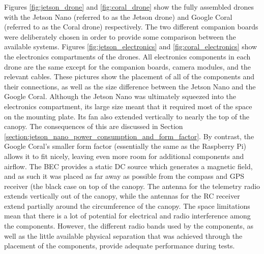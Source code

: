 Figures \ref{fig:jetson_drone} and \ref{fig:coral_drone} show the fully assembled drones with the Jetson Nano (referred to as the Jetson drone) and Google Coral (referred to as the Coral drone) respectively. The two different companion boards were deliberately chosen in order to provide some comparison between the available systems. Figures \ref{fig:jetson_electronics} and \ref{fig:coral_electronics} show the electronics compartments of the drones. All electronics components in each drone are the same except for the companion boards, camera modules, and the relevant cables. These pictures show the placement of all of the components and their connections, as well as the size difference between the Jetson Nano and the Google Coral. Although the Jetson Nano was ultimately squeezed into the electronics compartment, its large size meant that it required most of the space on the mounting plate. Its fan also extended vertically to nearly the top of the canopy. The consequences of this are discussed in Section \ref{section:jetson_nano_power_consumption_and_form_factor}. By contrast, the Google Coral's smaller form factor (essentially the same as the Raspberry Pi) allows it to fit nicely, leaving even more room for additional components and airflow. The BEC provides a static DC source which generates a magnetic field, and as such it was placed as far away as possible from the compass and GPS receiver (the black case on top of the canopy. The antenna for the telemetry radio extends vertically out of the canopy, while the antennas for the RC receiver extend partially around the circumference of the canopy. The space limitations mean that there is a lot of potential for electrical and radio interference among the components. However, the different radio bands used by the components, as well as the little available physical separation that was achieved through the placement of the components, provide adequate performance during tests.

